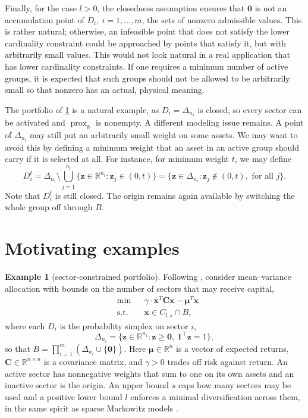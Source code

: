 \documentclass[11pt,a4paper]{article}
\theoremstyle{plain}
\theoremstyle{definition}
\newtheorem{example}{Example}
\theoremstyle{remark}
\newcommand*{\vz}{\mathbf{0}}
\newcommand*\R{\mathbb{R}}
\newcommand*\x{\mathbf{x}}
\newcommand*\z{\mathbf{z}}
\newcommand*\prox{\operatorname{prox}}
\begin{document}
Finally, for the case $l > 0$, the closedness assumption ensures that \( \vz \) is not an accumulation point of $D_i,\ i = 1, \ldots, m$, the sets of nonzero admissible values.
This is rather natural; otherwise, an infeasible point that does not satisfy the lower cardinality constraint could be approached by points that satisfy it, but with arbitrarily small values.
This would not look natural in a real application that has lower cardinality constraints.
If one requires a minimum number of active groups, it is expected that such groups should not be allowed to be arbitrarily small so that nonzero has an actual, physical meaning.

The portfolio of \cref{ex:carteira} is a natural example, as \(D_i=\Delta_{n_i}\) is closed, so every sector can be activated and \(\prox_h\) is nonempty.
A different modeling issue remains.
A point of \(\Delta_{n_i}\) may still put an arbitrarily small weight on some assets.
We may want to avoid this by defining a minimum weight that an asset in an active group should carry if it is selected at all.
For instance, for minimum weight $t$, we may define \[ D_i^{t} =\Delta_{n_i}\setminus\bigcup_{j=1}^{n_i}\bigl\{\z\in\R^{n_i}:\z_j\in(0,t)\bigr\} =\bigl\{\z\in\Delta_{n_i}:\z_j\notin(0,t),\text{ for all }j\bigr\}.
\]
Note that \(D_i^{t}\) is still closed.
The origin remains again available by switching the whole group off through \(B\).

\section{Motivating examples}
\label{sec:examples}

\begin{example}[sector-constrained portfolio]
  \label{ex:carteira}
  Following \cite{beck2018}, consider mean--variance allocation with  bounds on the number of sectors that may receive capital,
  \begin{equation}
    \label{eq:mv}
    \begin{aligned}
       & \min                &  & \gamma \cdot \x^T \mathbf{C} \x-\boldsymbol{\mu}^T \x \\
       & \operatorname{s.t.} &  & \x \in C_{l,s} \cap B,
    \end{aligned}
  \end{equation}
  where each \(D_i\) is the probability simplex on sector \(i\),
  \[
    \Delta_{n_i}
    =\bigl\{\z\in\R^{n_i}:\z\ge\vz,\ \mathbf{1}^\top\z=1\bigr\},
  \]
  so that
  \(B=\prod_{i=1}^m(\Delta_{n_i}\cup\{\vz\})\).
  Here \(\boldsymbol{\mu} \in \R^n\) is a vector of expected returns, \(\mathbf{C} \in \R^{n \times n}\) is a covariance matrix, and \(\gamma>0\) trades off risk against return.
  An active sector has nonnegative weights that sum to one on its own assets and an inactive sector is the origin.
  An upper bound \(s\) caps how many sectors may be used and a positive lower bound \(l\) enforces a minimal diversification across them, in the same spirit as sparse Markowitz models \cite{brodie2009}.
\end{example}
\end{document}

